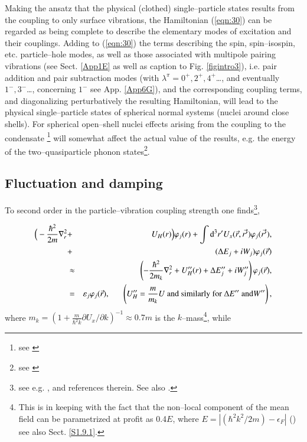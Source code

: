 Making the ansatz that the physical (clothed) single--particle states results from the coupling to only surface vibrations, the Hamiltonian (\ref{eqn:30}) can be regarded as being complete to describe the elementary modes of excitation and their couplings. Adding to (\ref{eqn:30}) the terms describing the spin, spin--isospin, etc. particle--hole modes, as well as those associated with multipole pairing vibrations (see Sect. \ref{App1E} as well as caption to Fig. \ref{figintro3}), i.e. pair addition and pair subtraction modes (with $\lambda^\pi=0^+,2^+,4^+$\dots, and eventually $1^-,3^-$\dots, concerning $1^-$ see App. \ref{App6G}), and the corresponding coupling terms, and diagonalizing perturbatively the resulting Hamiltonian, will lead to the physical single--particle states of spherical normal systems (nuclei around close shells). For spherical open--shell nuclei effects arising from the coupling to the condensate \footnote{see \cite{Bes:90}} will somewhat  affect the actual value of the results, e.g. the energy of the two--quasiparticle phonon states\footnote{see \cite{Barranco:04}}.  
\subsection{Fluctuation and damping}
 To second order in the particle--vibration coupling strength one finds\footnote{see e.g. \cite{Brink:05}, \cite{Mahaux:85} and references therein. See also \cite{Bernard:81}.},

\begin{eqnarray}\label{eqn:36}
\nonumber
\Big( -\frac{\hbar^2}{2m} \nabla_r^2 &+& U_H(r)\Big) \varphi_{j}(r) + \int {\rm d}^3 r' U_x(\vec{r},\vec{r'})\varphi_j(\vec{r'}), \\
\nonumber
&+& (\Delta E_j +iW_j)\varphi_j(\vec{r}) \\
&\approx& \left( -\frac{\hbar^2}{2m_k} \nabla_r^2 + U_H''(r) + \Delta E''_j + iW''_j \right) \varphi_j(\vec{r}), \\
\nonumber
&=& \varepsilon_j\varphi_j(\vec{r}), \;\;\;\;\;\; \left( U_H'' = \frac{m}{m_k} U\text{ and similarly for }\Delta E''\text{ and} W'' \right), 
\end{eqnarray}
 where  $m_k=\left(1+\frac{m}{\hbar^2 k}\partial U_x/\partial k\right)^{-1}\approx 0.7m$ is the $k$--mass\footnote{This is in keeping with the fact that the non--local component of the mean field can be parametrized at profit as 0.4$E$, where $E=|(\hbar^2k^2/2m)-\epsilon_F|$ (\cite{Perey:62}) see also Sect. \ref{S1.9.1}.}, while

